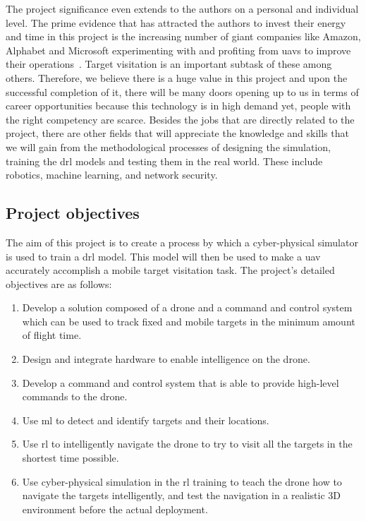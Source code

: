 \documentclass[../main.tex]{subfiles}
\begin{document}
The project significance even extends to the authors
on a personal and individual level.
The prime evidence that has attracted the authors to invest
their energy and time in this project is
the increasing number of giant companies like Amazon, Alphabet
and Microsoft experimenting with and profiting from \glspl{uav}
to improve their operations~\cite{Jun17}.
Target visitation is an important subtask of these among others.
Therefore, we believe there is a huge value
in this project and upon the successful completion of it,
there will be many doors opening up to us in terms of
career opportunities because 
this technology is in high demand yet, 
people with the right competency
are scarce.
Besides the jobs that are directly related to the project,
there are other fields that will appreciate the knowledge
and skills that we will gain from the methodological processes 
of designing the simulation,
training the \gls{drl} models and testing them in the real world.
These include robotics, machine learning, and 
network security.


\subsection{Project objectives}\label{sec:objectives}

The aim of this project is to create a process 
by which a cyber-physical simulator is used to train 
a \gls{drl} model. This model will then be used
to make a \gls{uav} accurately accomplish a
mobile target visitation task.
The project's detailed objectives are as follows:

\begin{enumerate}
    \item \label{obj:overview}
        Develop a solution composed of a drone and
        a command and control system which can be used
        to track fixed and mobile targets in the
        minimum amount of flight time.
    \item \label{obj:hardware} Design and integrate 
        hardware to enable 
        intelligence on the drone.
    \item Develop a command and control system that
        is able to provide high-level commands 
        to the drone.
    \item \label{obj:machine-learning} 
        Use \gls{ml} to detect and identify
        targets and their locations.
    \item \label{obj:drl} Use \gls{rl}
        to intelligently
        navigate the drone to try to visit all the targets
        in the shortest time possible.
    \item \label{obj:simulation} 
        Use cyber-physical simulation in the \gls{rl} training
        to teach the drone how to navigate the targets
        intelligently, and test the navigation in a realistic
        3D environment before the actual deployment.
\end{enumerate}
\end{document}
